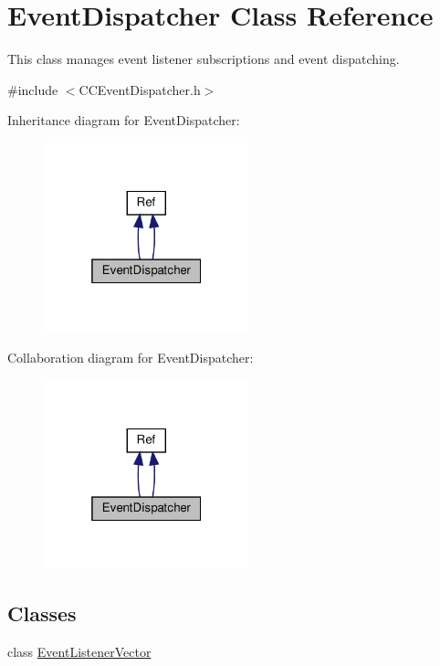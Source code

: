 \hypertarget{classEventDispatcher}{}\section{Event\+Dispatcher Class Reference}
\label{classEventDispatcher}


This class manages event listener subscriptions and event dispatching.  




{\ttfamily \#include $<$C\+C\+Event\+Dispatcher.\+h$>$}



Inheritance diagram for Event\+Dispatcher\+:
\nopagebreak
\begin{figure}[H]
\begin{center}
\leavevmode
\includegraphics[width=169pt]{classEventDispatcher__inherit__graph}
\end{center}
\end{figure}


Collaboration diagram for Event\+Dispatcher\+:
\nopagebreak
\begin{figure}[H]
\begin{center}
\leavevmode
\includegraphics[width=169pt]{classEventDispatcher__coll__graph}
\end{center}
\end{figure}
\subsection*{Classes}
\begin{DoxyCompactItemize}
\item 
class \hyperlink{classEventDispatcher_1_1EventListenerVector}{Event\+Listener\+Vector}
\end{DoxyCompactItemize}
